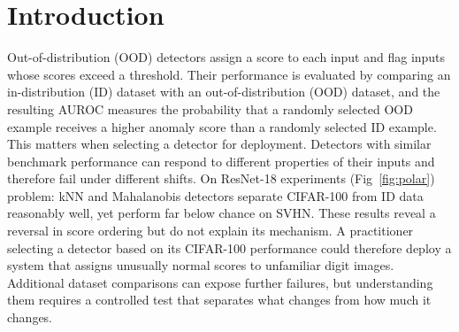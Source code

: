 \documentclass[twoside]{article}
\theoremstyle{definition}
\theoremstyle{remark}
\begin{document}

\begin{abstract}
OOD detectors are often compared using static metrics like AUROC, which average over unspecified shift mixtures and hide which shifts a detector misses. We instead evaluate detectors on shared, declared paths in representation space: steer in-distribution features along a path, calibrate all detectors to the same in-distribution rejection rate, and record the distance at which each first rejects. Because a detector depends on inputs only via features, never rejecting a path implies blindness to any input shift that realises that path. Decomposing paths into radial and angular components, we show that for linear-head energy and Euclidean-distance scores, radial growth pushes energy toward acceptance and distance toward rejection, while radial shrinkage drives distance toward its origin value and energy toward a bias-only constant. We derive exact conditions for each detector’s decision at the origin and show calibrated energy decisions depend on a classifier component that does not change predictions. Across four text and four vision encoders and three seeds, all origin conditions match observations, and distance- and logit-based detectors fail on different paths.
\end{abstract}

\section{Introduction}
\label{sec:Introduction}
Out-of-distribution (OOD) detectors \cite{liang2020enhancing,tack2020csi,hendrycks2018baseline} assign a score to each input and flag inputs whose scores exceed a threshold. Their performance is evaluated by comparing an in-distribution (ID) dataset with an out-of-distribution (OOD) dataset, and the resulting AUROC measures the probability that a randomly selected OOD example receives a higher anomaly score than a randomly selected ID example. 
This matters when selecting a detector for deployment. Detectors with similar benchmark performance can respond to different properties of their inputs and therefore fail under different shifts. On ResNet-18 experiments (Fig~\ref{fig:polar}) problem: kNN and Mahalanobis detectors separate CIFAR-100 from ID data reasonably well, yet perform far below chance on SVHN. These results reveal a reversal in score ordering but do not explain its mechanism. A practitioner selecting a detector based on its CIFAR-100 performance could therefore deploy a system that assigns unusually normal scores to unfamiliar digit images. Additional dataset comparisons can expose further failures, but understanding them requires a controlled test that separates what changes from how much it changes.
\end{document}
